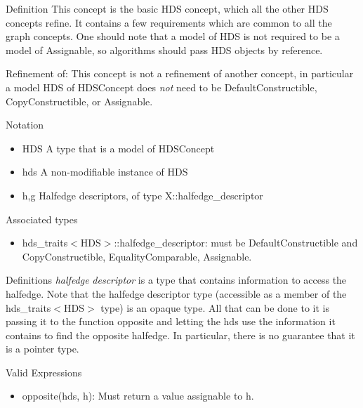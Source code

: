 \begin{Desc}
\item[Definition]This concept is the basic HDS concept, which all the other HDS concepts refine. It contains a few requirements which are common to all the graph concepts. One should note that a model of HDS is not required to be a model of Assignable, so algorithms should pass HDS objects by reference.\end{Desc}
\begin{Desc}
\item[Refinement of:]This concept is not a refinement of another concept, in particular a model HDS of HDSConcept does {\em not\/} need to be Default\-Constructible, Copy\-Constructible, or Assignable.\end{Desc}
\begin{Desc}
\item[Notation]\begin{itemize}
\item HDS A type that is a model of HDSConcept\item hds A non-modifiable instance of HDS\item h,g Halfedge descriptors, of type X::halfedge\_\-descriptor\end{itemize}
\end{Desc}
\begin{Desc}
\item[Associated types]\begin{itemize}
\item hds\_\-traits$<$HDS$>$::halfedge\_\-descriptor: must be Default\-Constructible and Copy\-Constructible, Equality\-Comparable, Assignable.\end{itemize}
\end{Desc}
\begin{Desc}
\item[Definitions]{\em halfedge\/} {\em descriptor\/} is a type that contains information to access the halfedge. Note that the halfedge descriptor type (accessible as a member of the hds\_\-traits$<$HDS$>$ type) is an opaque type. All that can be done to it is passing it to the function opposite and letting the hds use the information it contains to find the opposite halfedge. In particular, there is no guarantee that it is a pointer type.\end{Desc}
\begin{Desc}
\item[Valid Expressions]\begin{itemize}
\item opposite(hds, h): Must return a value assignable to h.\end{itemize}
\end{Desc}
